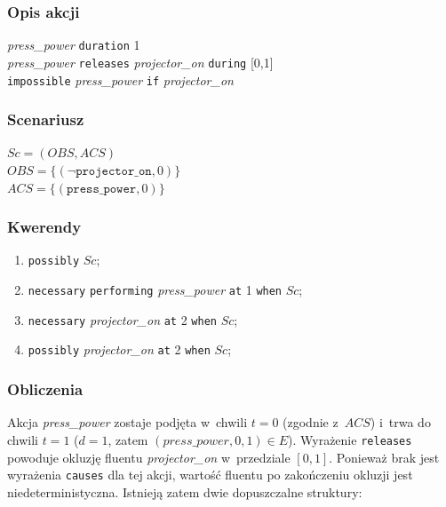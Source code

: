 \documentclass[12pt,a4paper]{article}
\newcommand{\langkw}[1]{\texttt{#1}}
\newcommand{\langvar}[1]{\textit{#1}}
\newenvironment{actiondesc}
{\par\begingroup\small\setlength{\parindent}{0pt}\setlength{\parskip}{0pt}\noindent}
{\par\endgroup}
\begin{document}
\subsubsection*{Opis akcji}

\begin{actiondesc}
\langvar{press\_power} \langkw{duration} 1\\
\langvar{press\_power} \langkw{releases} \langvar{projector\_on} \langkw{during} [0,1]\\
\langkw{impossible} \langvar{press\_power} \langkw{if} \langvar{projector\_on}
\end{actiondesc}

\subsubsection*{Scenariusz}

\noindent
$Sc = (OBS, ACS)$\\
$OBS = \{(\neg \texttt{projector\_on}, 0)\}$\\
$ACS = \{(\texttt{press\_power}, 0)\}$

\subsubsection*{Kwerendy}

\begin{enumerate}[label=\arabic*.]
    \item \langkw{possibly} $Sc$;
    \item \langkw{necessary} \langkw{performing} \langvar{press\_power} \langkw{at} 1 \langkw{when} $Sc$;
    \item \langkw{necessary} \langvar{projector\_on} \langkw{at} 2 \langkw{when} $Sc$;
    \item \langkw{possibly} \langvar{projector\_on} \langkw{at} 2 \langkw{when} $Sc$;
\end{enumerate}

\subsubsection*{Obliczenia}

Akcja \langvar{press\_power} zostaje podjęta w~chwili $t=0$ (zgodnie z~$ACS$) i~trwa do chwili $t=1$ ($d=1$, zatem $(press\_power, 0, 1) \in E$). Wyrażenie \langkw{releases} powoduje okluzję fluentu \langvar{projector\_on} w~przedziale $[0,1]$. Ponieważ brak jest wyrażenia \langkw{causes} dla tej akcji, wartość fluentu po zakończeniu okluzji jest niedeterministyczna. Istnieją zatem dwie dopuszczalne struktury:
\end{document}

